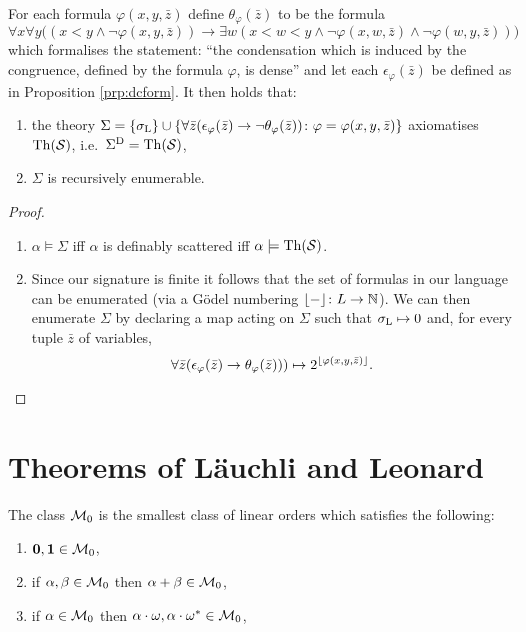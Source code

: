 \begin{prp}\label{prp:rescat}
	For each formula $\varphi(x,y,\bar{z})$ define $\theta_\varphi(\bar{z})$ to be the formula
	\begin{equation}
		\forall x\forall y\big((x<y\wedge\neg\varphi(x,y,\bar{z}))\rightarrow\exists w(x<w<y\wedge\neg\varphi(x,w,\bar{z})\wedge\neg\varphi(w,y,\bar{z}))\big)
	\end{equation}
	which formalises the statement: ``the condensation which is induced by the congruence, defined by the formula $\varphi$, is dense'' and let each $\epsilon_\varphi(\bar{z})$ be defined as in Proposition \ref{prp:dcform}.  It then holds that:
	\begin{enumerate}
		\item the theory $\Sigma=\left\lbrace \sigma_{\mathrm{L}}\right\rbrace\cup\left\lbrace \forall\bar{z}(\epsilon_\varphi(\bar{z})\rightarrow\neg\theta_\varphi(\bar{z}))\colon \varphi=\varphi(x,y,\bar{z}) \right\rbrace$ axiomatises $\operatorname{Th}(\mathcal{S})$, i.e.\ ${\Sigma}^\mathrm{D}=\operatorname{Th}(\mathcal{S})$,

		\item $\Sigma$ is recursively enumerable.
	\end{enumerate}
	\begin{proof}
		\begin{enumerate}[nosep]
			\item	$\alpha\models\Sigma$ iff $\alpha$ is definably scattered iff $\alpha\models\operatorname{Th}(\mathcal{S})$.
			\item	Since our signature is finite it follows that the set of formulas in our language can be enumerated (via a G\"odel numbering $\lfloor -\rfloor\colon L\to\mathbb{N}$).  We can then enumerate $\Sigma$ by declaring a map acting on $\Sigma$ such that $\sigma_{\mathrm{L}}\mapsto 0$ and, for every tuple $\bar{z}$ of variables,
			\begin{equation}
				\forall \bar{z}(\epsilon_\varphi(\bar{z})\rightarrow\theta_\varphi(\bar{z})))\mapsto 2^{\lfloor \varphi(x,y,\bar{z})\rfloor}.
			\end{equation}
		\end{enumerate}
	\end{proof}
\end{prp}


\section{Theorems of L\"auchli and Leonard}

\begin{dfn}
	The class $\mathcal{M}_0$ is the smallest class of linear orders which satisfies the following:
	\begin{enumerate}
		\item	$\mathbf{0},\mathbf{1}\in\mathcal{M}_0$,
		\item	if $\alpha,\beta\in\mathcal{M}_0$ then $\alpha+\beta\in\mathcal{M}_0$,
		\item	if $\alpha\in\mathcal{M}_0$ then $\alpha\cdot\omega,\alpha\cdot{\omega}^\ast\in\mathcal{M}_0$,
	\end{enumerate}
\end{dfn}

